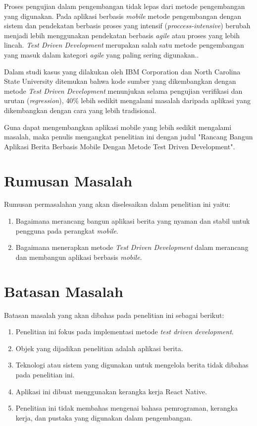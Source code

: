 \begin{spacing}{2}
Proses pengujian dalam pengembangan tidak lepas dari metode pengembangan yang digunakan. Pada aplikasi berbasis \emph{mobile} metode pengembangan dengan sistem dan pendekatan berbasis proses yang intensif (\emph{proccess-intensive}) berubah menjadi lebih menggunakan pendekatan berbasis \emph{agile} atau proses yang lebih lincah. \emph{Test Driven Development} merupakan salah satu metode pengembangan yang masuk dalam kategori \emph{agile} yang paling sering digunakan.\cite{wasserman2010}.

Dalam studi kasus yang dilakukan oleh IBM Corporation dan North Carolina State University ditemukan bahwa kode sumber yang dikembangkan dengan metode \emph{Test Driven Development} menunjukan selama pengujian verifikasi dan urutan (\emph{regression}), 40\% lebih sedikit mengalami masalah daripada aplikasi yang dikembangkan dengan cara yang lebih tradisional.\cite{laurie2003}

Guna dapat mengembangkan aplikasi mobile yang lebih sedikit mengalami masalah, maka penulis mengangkat penelitian ini dengan judul "Rancang Bangun Aplikasi Berita Berbasis Mobile Dengan Metode Test Driven Development".

\section{Rumusan Masalah}
Rumusan permasalahan yang akan diselesaikan dalam penelitian ini yaitu:
\begin{enumerate}
  \item Bagaimana merancang bangun aplikasi berita yang nyaman dan stabil untuk pengguna pada perangkat \emph{mobile}.
  \item Bagaimana menerapkan metode \emph{Test Driven Development} dalam merancang dan membangun aplikasi berbasis \emph{mobile}.
\end{enumerate}

\section{Batasan Masalah}
Batasan masalah yang akan dibahas pada penelitian ini sebagai berikut:
\begin{enumerate}
  \item Penelitian ini fokus pada implementasi metode \emph{test driven development}.
  \item Objek yang dijadikan penelitian adalah aplikasi berita.
  \item Teknologi atau sistem yang digunakan untuk mengelola berita tidak dibahas pada penelitian ini.
  \item Aplikasi ini dibuat menggunakan kerangka kerja React Native.
  \item Penelitian ini tidak membahas mengenai bahasa pemrograman, kerangka kerja, dan pustaka yang digunakan dalam pengembangan.
\end{enumerate}



\end{spacing}
